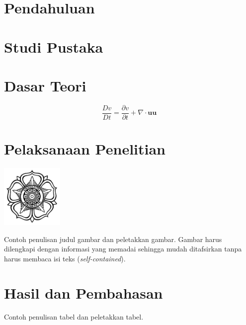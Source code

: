 \documentclass[a4paper,10pt]{article}
\newcommand{\SSS}{\renewcommand{\baselinestretch}{1.5}\tiny \normalsize }
\begin{document}
\begin{body}
\SSS
\section{Pendahuluan}
\lipsum[1-2]

\section{Studi Pustaka}
\lipsum[1-2]

\section{Dasar Teori}
\lipsum[5-6]

\begin{equation}
    \dfrac{Dv}{Dt} = \dfrac{\partial v}{\partial t} + \nabla \cdot \mathbf{uu}
\label{eq:1}
\end{equation}



\section{Pelaksanaan Penelitian}
\lipsum[50-51]
\begin{figurehere}
    \centering
    \includegraphics[width=3cm]{logoUGM.jpg}
    \caption{Contoh penulisan judul gambar dan peletakkan gambar. Gambar harus dilengkapi
dengan informasi yang memadai sehingga mudah ditafsirkan tanpa harus membaca
isi teks (\textit{self-contained}).}
    \label{fig:1}
\end{figurehere}

\section{Hasil dan Pembahasan}
\lipsum[76-77]
\begin{tablehere}

    

    \caption{Contoh penulisan tabel dan peletakkan tabel.}
    \label{tbl:1}
    \begin{center}
    


\end{center}
\end{tablehere}
\end{body}
\end{document}
